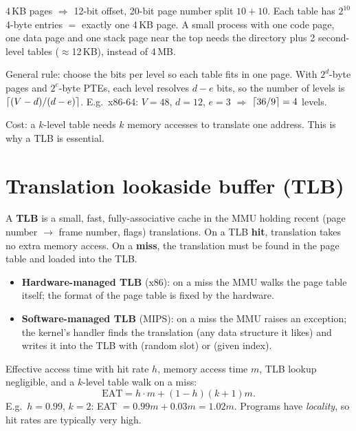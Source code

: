 \begin{example}
4\,KB pages $\Rightarrow$ 12-bit offset, 20-bit page number split $10 + 10$. Each table has
$2^{10}$ 4-byte entries $=$ exactly one 4\,KB page. A small process with one code page, one data
page and one stack page near the top needs the directory plus 2 second-level tables
($\approx$12\,KB), instead of 4\,MB.

General rule: choose the bits per level so each table fits in one page. With $2^{d}$-byte pages
and $2^{e}$-byte PTEs, each level resolves $d-e$ bits, so the number of levels is
$\left\lceil (V-d)/(d-e) \right\rceil$. E.g.\ x86-64: $V=48$, $d=12$, $e=3$ $\Rightarrow$ $\left\lceil 36/9 \right\rceil = 4$ levels.
\end{example}

Cost: a $k$-level table needs $k$ memory accesses to translate one address. This is why a TLB is
essential.

\section{Translation lookaside buffer (TLB)}

\begin{definition}[TLB]
A \textbf{TLB} is a small, fast, fully-associative cache in the MMU holding recent
(page number $\to$ frame number, flags) translations. On a TLB \textbf{hit}, translation takes no
extra memory access. On a \textbf{miss}, the translation must be found in the page table and
loaded into the TLB.
\end{definition}

\begin{itemize}
  \item \textbf{Hardware-managed TLB} (x86): on a miss the MMU walks the page table itself; the
    format of the page table is fixed by the hardware.
  \item \textbf{Software-managed TLB} (MIPS): on a miss the MMU raises an exception; the
    kernel's handler finds the translation (any data structure it likes) and writes it into the
    TLB with  (random slot) or  (given index).
\end{itemize}

Effective access time with hit rate $h$, memory access time $m$, TLB lookup negligible, and a
$k$-level table walk on a miss:
\[ \text{EAT} = h\cdot m + (1-h)(k+1)m. \]
E.g.\ $h = 0.99$, $k=2$: EAT $= 0.99m + 0.03m = 1.02m$. Programs have \emph{locality}, so
hit rates are typically very high.

